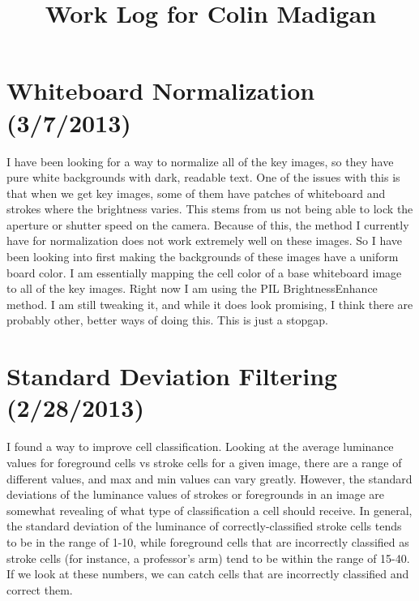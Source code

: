 \documentclass[]{article}
\begin{document}
\title{Work Log for Colin Madigan}
\date{}
\maketitle
	\tableofcontents
\newpage
	
	\section{Whiteboard Normalization (3/7/2013)}	
		I have been looking for a way to normalize all of the key images, so they have pure white backgrounds with dark, readable text.  One of the issues with this is that when we get key images, some of them have patches of whiteboard and strokes where the brightness varies.  This stems from us not being able to lock the aperture or shutter speed on the camera.  Because of this, the method I currently have for normalization does not work extremely well on these images.  So I have been looking into first making the backgrounds of these images have a uniform board color.  I am essentially mapping the cell color of a base whiteboard image to all of the key images.  Right now I am using the PIL BrightnessEnhance method.  I am still tweaking it, and while it does look promising, I think there are probably other, better ways of doing this.  This is just a stopgap.  

%		
	
	\section{Standard Deviation Filtering (2/28/2013)}	
		I found a way to improve cell classification.  Looking at the average luminance values for foreground cells vs stroke cells for a given image, there are a range of different values, and max and min values can vary greatly.  However, the standard deviations of the luminance values of strokes or foregrounds in an image are somewhat revealing of what type of classification a cell should receive.  In general, the standard deviation of the luminance of correctly-classified stroke cells tends to be in the range of 1-10, while foreground cells that are incorrectly classified as stroke cells (for instance, a professor's arm) tend to be within the range of 15-40.  If we look at these numbers, we can catch cells that are incorrectly classified and correct them.  
\end{document}
